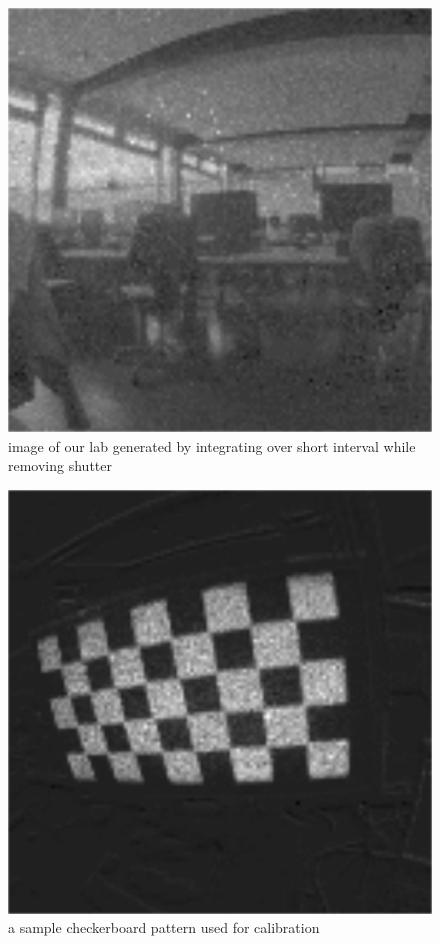\begin{figure}
\includegraphics[width=\linewidth]{images/PCLab_integrated.png}
\caption{image of our lab generated by integrating over short interval while removing shutter}
\label{fig:shutter_integration}
\end{figure}

\begin{figure}
\includegraphics[width=\linewidth]{images/checkerboard_integrated.png}
\caption{a sample checkerboard pattern used for calibration}
\label{fig:calibration}
\end{figure}

